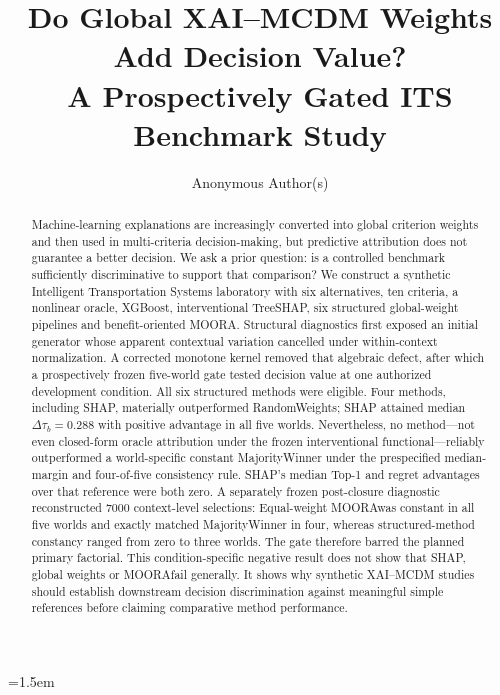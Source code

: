 \documentclass[runningheads]{llncs}
\newcommand{\XGB}{XGBoost}
\newcommand{\MOORA}{MOORA}
\begin{document}
\emergencystretch=1.5em

\title{Do Global XAI--MCDM Weights Add Decision Value?\\
A Prospectively Gated ITS Benchmark Study}

\author{Anonymous Author(s)}

\maketitle

\begin{abstract}
Machine-learning explanations are increasingly converted into global criterion weights and
then used in multi-criteria decision-making, but predictive attribution does not guarantee a
better decision. We ask a prior question: is a controlled benchmark sufficiently
discriminative to support that comparison? We construct a synthetic Intelligent
Transportation Systems laboratory with six alternatives, ten criteria, a nonlinear oracle,
\XGB, interventional TreeSHAP, six structured global-weight pipelines and benefit-oriented
\MOORA. Structural diagnostics first exposed an initial generator whose apparent contextual
variation cancelled under within-context normalization. A corrected monotone kernel removed
that algebraic defect, after which a prospectively frozen five-world gate tested decision value
at one authorized development condition. All six structured methods were eligible. Four methods,
including SHAP, materially outperformed RandomWeights; SHAP attained median
$\Delta\tau_b=0.288$ with positive advantage in all five worlds. Nevertheless, no method---not
even closed-form oracle attribution under the frozen interventional functional---reliably
outperformed a world-specific constant MajorityWinner under the prespecified median-margin and
four-of-five consistency rule. SHAP's median Top-1 and regret advantages over that reference
were both zero. A separately frozen post-closure diagnostic reconstructed 7000 context-level
selections: Equal-weight \MOORA was constant in all five worlds and exactly matched
MajorityWinner in four, whereas structured-method constancy ranged from zero to three worlds.
The gate therefore barred the planned primary factorial. This condition-specific negative
result does not show that SHAP, global weights or \MOORA fail generally. It shows why synthetic
XAI--MCDM studies should establish downstream decision discrimination against meaningful
simple references before claiming comparative method performance.

\end{abstract}
\end{document}
